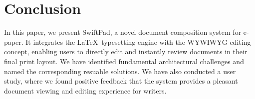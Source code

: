 \documentclass[]{sigchi}
\begin{document}

 


\section{Conclusion}
In this paper, we present SwiftPad, a novel document composition system for e-paper. It integrates the \LaTeX\ typesetting engine with the WYWIWYG editing concept, enabling users to directly edit and instantly review documents in their final print layout. 
We have identified fundamental architectural challenges and named the corresponding resuable solutions. 
We have also conducted a user study, where we found positive feedback that the system provides a pleasant document viewing and editing experience for writers.




\end{document}
